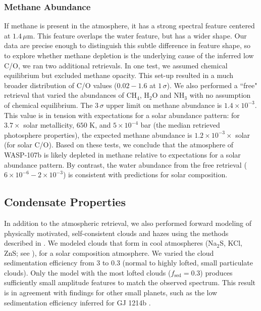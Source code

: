 \documentclass[twocolumn, trackchanges]{aastex61}
\begin{document}
\subsubsection{Methane Abundance}
If methane is present in the atmosphere, it has a strong spectral feature centered at $1.4\,\mu$m. This feature overlaps the water feature, but has a wider shape. Our data are precise enough to distinguish this subtle difference in feature shape, so to explore whether methane depletion is the underlying cause of the inferred low C/O, we ran two additional retrievals.  In one test, we assumed chemical equilibrium but excluded methane opacity. This set-up resulted in a much broader distribution of C/O values ($0.02 - 1.6$ at $1\,\sigma$).  We also performed a ``free" retrieval that varied the abundances of CH$_4$, H$_2$O and NH$_3$ with no assumption of chemical equilibrium. The $3\,\sigma$ upper limit on methane abundance is $1.4\times10^{-3}$. This value is in tension with expectations for a solar abundance pattern: for $3.7\times$ solar metallicity, $650$ K, and $5\times10^{-4}$ bar (the median retrieved photosphere properties), the expected methane abundance is $1.2\times10^{-3}\times$ solar (for solar C/O). Based on these tests, we conclude that the atmosphere of WASP-107b is likely depleted in methane relative to expectations for a solar abundance pattern. By contrast, the water abundance from the free retrieval ($6\times10^{-6} - 2\times10^{-3}$) is consistent with predictions for solar composition. 
	

\subsection{Condensate Properties}
In addition to the atmospheric retrieval, we also performed forward modeling of physically motivated, self-consistent clouds and hazes using the methods described in \cite{fortney08, morley15}.  We modeled clouds that form in cool atmospheres (Na$_2$S, KCl, ZnS; see \citealt{morley12}), for a solar composition atmosphere. We varied the cloud sedimentation efficiency from 3 to 0.3 (normal to highly lofted, small particulate clouds).  Only the model with the most lofted clouds ($f_\mathrm{sed} = 0.3$) produces sufficiently small amplitude features to match the observed spectrum.  This result is in agreement with findings for other small planets, such as the low sedimentation efficiency inferred for GJ 1214b \citep[$f_\mathrm{sed} < 0.1$][]{morley15}.  

\end{document}
